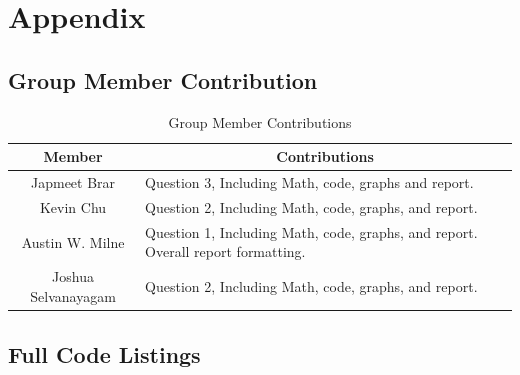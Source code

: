 \documentclass[12pt]{article}
\begin{document}
\clearpage

\clearpage
\section{Appendix} \label{sec:appendix}

\subsection{Group Member Contribution}

\begin{table}[H]
    \centering
    \caption{Group Member Contributions}
    \label{tab:member_contribution}
    \begin{tabular}{|c|p{9cm}|} \hline
        Member & \multicolumn{1}{|c|}{Contributions} \\ \hline
        Japmeet Brar & Question 3, Including Math, code, graphs and report. \\ \hline
        Kevin Chu & Question 2, Including Math, code, graphs, and report. \\ \hline
        Austin W. Milne & Question 1, Including Math, code, graphs, and report. Overall report formatting.\\ \hline
        Joshua Selvanayagam & Question 2, Including Math, code, graphs, and report. \\ \hline
    \end{tabular}
\end{table}

\subsection{Full Code Listings} \label{sec:code_listings}


\clearpage


\clearpage


\clearpage


\end{document}
